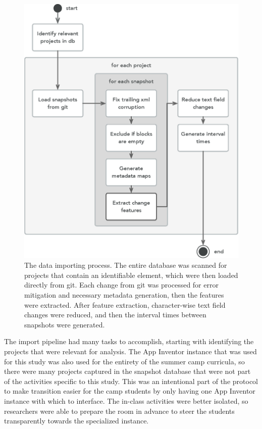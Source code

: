 \begin{figure}
  \centering
      \includegraphics[width=\textwidth]{diagrams/data-import-process}
  \caption[The data importing process]{The data importing process. The entire database was scanned for projects that contain an identifiable element, which were then loaded directly from git. Each change from git was processed for error mitigation and necessary metadata generation, then the features were extracted. After feature extraction, character-wise text field changes were reduced, and then the interval times between snapshots were generated.}
  \label{fig:data-import-process}
\end{figure}

The import pipeline had many tasks to accomplish, starting with identifying the projects that were relevant for analysis. The App Inventor instance that was used for this study was also used for the entirety of the summer camp curricula, so there were many projects captured in the snapshot database that were not part of the activities specific to this study. This was an intentional part of the protocol to make transition easier for the camp students by only having one App Inventor instance with which to interface. The in-class activities were better isolated, so researchers were able to prepare the room in advance to steer the students transparently towards the specialized instance. 

